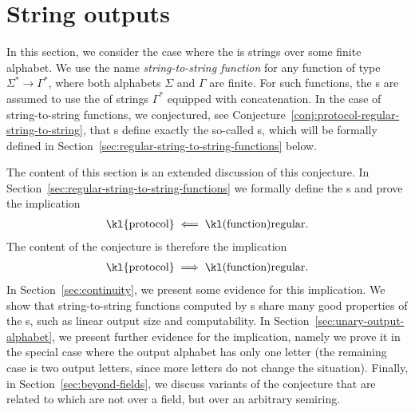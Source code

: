 \section{String outputs}
\label{sec:string-outputs}

In this section, we consider the case where the  is strings over
some finite alphabet. We use the name \emph{string-to-string function} for any
function of type $\Sigma^* \to \Gamma^*$, where both alphabets $\Sigma$ and
$\Gamma$ are finite. For such functions, the s are assumed to use the
 of strings $\Gamma^*$ equipped with concatenation. In the case of
string-to-string functions, we conjectured, see
Conjecture~\ref{conj:protocol-regular-string-to-string},  that s define
exactly the so-called s, which will be formally defined in
Section~\ref{sec:regular-string-to-string-functions} below.
 




The content of this section is an extended discussion of this conjecture.
In Section~\ref{sec:regular-string-to-string-functions} we  formally  define the s and  prove the implication 
\begin{align*}
\text{\kl{protocol}} \impliedby \text{\kl(function){regular}}.
\end{align*}
The content of the conjecture is therefore the implication 
\begin{align*}
\text{\kl{protocol}} \implies \text{\kl(function){regular}}.
\end{align*}
In Section~\ref{sec:continuity}, we present some evidence for this implication. We  show that string-to-string functions computed by s share many good properties of the s, such as linear output size and computability. In Section~\ref{sec:unary-output-alphabet}, we present further evidence for the implication, namely we  prove it in the special case where the output alphabet has only one letter (the remaining case is two output letters, since more letters do not change the situation). Finally, in Section~\ref{sec:beyond-fields}, we discuss variants of the conjecture that are related to  which are not over a field, but over an arbitrary semiring. 






